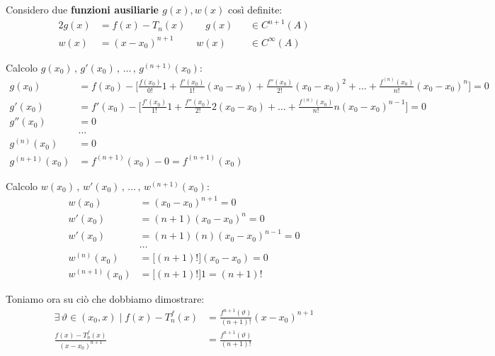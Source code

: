 \documentclass[../../dimostrazioni]{subfiles}
\begin{document}
            \medskip

            Considero due \textbf{funzioni ausiliarie \(g(x), w(x)\)} così definite:
            \begin{alignat*}{2}
                g(x) &= f(x) - T_n (x) \qquad g(x) &&\in C^{n+1} (A)\\
                w(x) &= (x - x_0)^{n+1} \qquad \; w(x) &&\in C^{\infty} (A)
            \end{alignat*}

            \newpage

            Calcolo \( g(x_0)\, , \, g'(x_0)\, ,\, \dots\, , \, g ^{(n+1)}(x_0)  \):
            \begin{align*}
                g(x_0) &= f(x_0) - \bigg[\frac{f(x_0)}{0!}1 + \frac{f'(x_0)}{1!}(x_0-x_0) + \frac{f''(x_0)}{2!}(x_0-x_0)^2 + \dots + \frac{f^{(n)}(x_0)}{n!}(x_0-x_0)^n \bigg] = 0\\
                g'(x_0) &= f'(x_0) - \bigg[\frac{f'(x_0)}{1!}1 + \frac{f''(x_0)}{2!}2(x_0-x_0) + \dots + \frac{f^{(n)}(x_0)}{n!}n(x_0-x_0)^{n-1} \bigg] = 0\\
                g''(x_0) &= 0\\
                &\dots\\
                g^{(n)} (x_0) &= 0\\
                g^{(n+1)} (x_0) &= f^{(n+1)}(x_0) - 0 = f^{(n+1)}(x_0)
            \end{align*}

            \bigskip
            
            Calcolo \( w(x_0)\, , \, w'(x_0)\, ,\, \dots\, , \, w ^{(n+1)}(x_0)  \):
            \begin{align*}
                w(x_0) &= (x_0 - x_0)^{n+1} = 0\\
                w'(x_0) &= (n+1)(x_0 - x_0)^{n} = 0\\
                w'(x_0) &= (n+1)(n)(x_0 - x_0)^{n-1} = 0\\
                & \dots\\
                w^{(n)} (x_0) &= \big[(n+1)!\big](x_0 - x_0) = 0\\
                w^{(n+1)} (x_0) &= \big[(n+1)!\big] 1 = (n+1)!
            \end{align*}

            \bigskip

            Toniamo ora su ciò che dobbiamo dimostrare:
            \begin{align*}
                \exists \, \vartheta \in (x_0, x) \; | \; f(x) - T _n ^ f (x) &= \frac{f^{n+1}(\vartheta)}{(n+1)!}(x-x_0)^{n+1}\\
                \frac{f(x) - T _n ^ f (x)}{(x-x_0)^{n+1}} &= \frac{f^{n+1}(\vartheta)}{(n+1)!}
            \end{align*}
\end{document}

